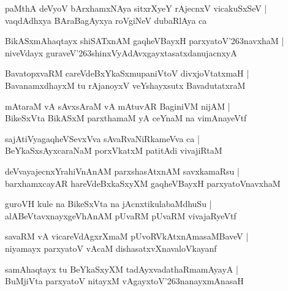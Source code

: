 \documentclass[twoside,12pt,openright]{book}
\def\S{\char'263}
\newcounter{shloka}[chapter]
\begin{document}
\begin{shloka}
paMthA deVyoV bArxhamxNAya sitxrXyeY rAjecnxV vicakuSxSeV |\\
vaqdAdhxya BAraBagAyxya roVgiNeV dubaRlAya ca 
\end{shloka}

\begin{shloka}
BikASxmAhaqtayx shiSATxnAM gaqheVBayxH parxyatoV\S navxhaM |\\
niveVdayx guraveV\S shinxVyAdAvxgayxtasatxdanujacnxyA 
\end{shloka}

\begin{shloka}
BavatopxvaRM careVdeBxYkaSxmupaniVtoV divxjoVtatxmaH |\\
BavanamxdhayxM tu rAjanoyxV veYshayxsutx BavadutatxraM 
\end{shloka}

\begin{shloka}
mAtaraM vA sAvxsAraM vA mAtuvAR BaginiVM nijAM |\\
BikeSxVta BikASxM parxthamaM yA ceYnaM na vimAnayeVtf 
\end{shloka}

\begin{shloka}
sajAtiVyagaqheVSevxVva sAvaRvaNiRkameVva ca |\\
BeYkaSxsAyxcaraNaM porxVkatxM patitAdi vivajiRtaM 
\end{shloka}

\begin{shloka}
deVvayajecnxYrahiVnAnAM parxshasAtxnAM savxkamaRsu |\\
barxhamxcayAR hareVdeBxkaSxyXM gaqheVBayxH parxyatoVnavxhaM 
\end{shloka}

\begin{shloka}
guroVH kule na BikeSxVta na jAcnxtikulabaMdhuSu |\\
alABeVtavxnayxgeVhAnAM pUvaRM pUvaRM vivajaRyeVtf 
\end{shloka}

\begin{shloka}
savaRM vA vicareVdAgxrXmaM pUvoRVkAtxnAmasaMBaveV |\\
niyamayx parxyatoV vAcaM dishasatxvXnavaloVkayanf 
\end{shloka}

\begin{shloka}
samAhaqtayx tu BeYkaSxyXM tadAyxvadathaRmamAyayA |\\
BuMjiVta parxyatoV nitayxM vAgayxtoV\S nanayxmAnasaH
\end{shloka}
\end{document}
